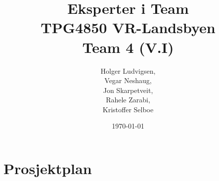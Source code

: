 \documentclass[12pt]{report}
\author{Holger Ludvigsen,\\Vegar Neshaug,\\Jon Skarpetveit,\\Rahele Zarabi,\\Kristoffer Selboe}
\title{{\small Eksperter i Team\\TPG4850 VR-Landsbyen}\\\textbf{Team 4 (V.I)}}
\date{{\small \today}}
\begin{document}
\maketitle



\pagebreak
	
\setlength{\parskip}{0.0in}
\renewcommand*\contentsname{Innhold}
\tableofcontents
\renewcommand*\listtablename{Tabell-liste}
\listoftables
\renewcommand*\listfigurename{Figurliste}
\listoffigures

\pagebreak
\setlength{\parskip}{0.1in}

\setcounter{page}{1} %



\part{Prosjektplan}
\end{document}
